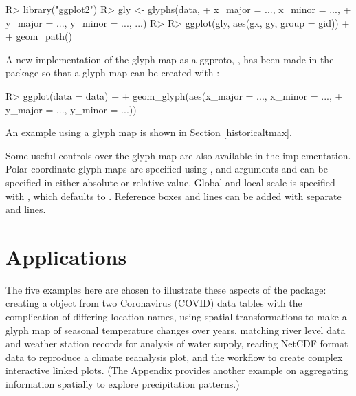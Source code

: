 \documentclass[
  shortnames]{jss}
\begin{document}
\begin{CodeChunk}
\begin{CodeInput}
R> library("ggplot2")
R> gly <- glyphs(data,
+               x_major = ..., x_minor = ...,
+               y_major = ..., y_minor = ..., ...)
R> 
R> ggplot(gly, aes(gx, gy, group = gid)) +
+   geom_path()
\end{CodeInput}
\end{CodeChunk}

A new implementation of the glyph map as a ggproto, , has been made in the  package so that a glyph map can be created with :

\begin{CodeChunk}
\begin{CodeInput}
R> ggplot(data = data) +
+   geom_glyph(aes(x_major = ..., x_minor = ...,
+                  y_major = ..., y_minor = ...))
\end{CodeInput}
\end{CodeChunk}

An example using a glyph map is shown in Section \ref{historicaltmax}.

Some useful controls over the glyph map are also available in the  implementation. Polar coordinate glyph maps are specified using , and arguments  and  can be specified in either absolute or relative value. Global and local scale is specified with , which defaults to . Reference boxes and lines can be added with separate  and  lines.

\hypertarget{examples}{%
\section{Applications}\label{examples}}

The five examples here are chosen to illustrate these aspects of the  package: creating a  object from two Coronavirus (COVID) data tables with the complication of differing location names, using spatial transformations to make a glyph map of seasonal temperature changes over years, matching river level data and weather station records for analysis of water supply, reading NetCDF format data to reproduce a climate reanalysis plot, and the workflow to create complex interactive linked plots. (The Appendix provides another example on aggregating information spatially to explore precipitation patterns.)
\end{document}
